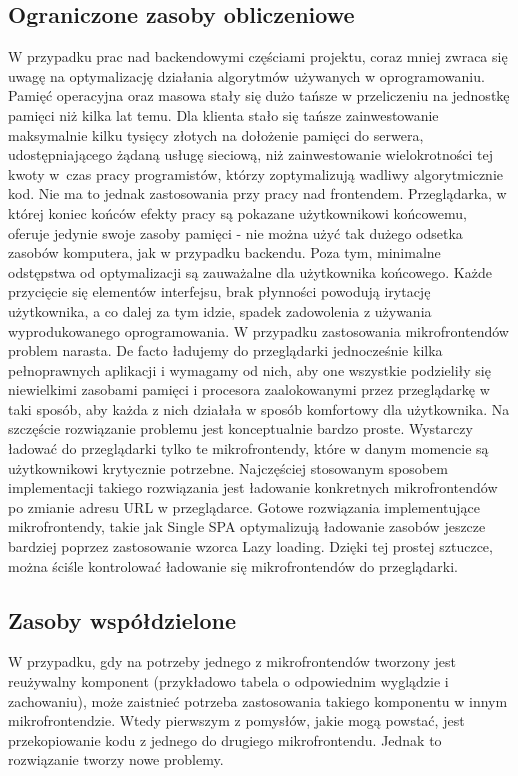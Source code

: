 \documentclass{SGGW-thesis}
\begin{document}
\subsection{Ograniczone zasoby obliczeniowe}
W przypadku prac nad backendowymi częściami projektu, coraz mniej zwraca się uwagę na optymalizację działania algorytmów używanych w oprogramowaniu. Pamięć operacyjna oraz masowa stały się dużo tańsze w przeliczeniu na jednostkę pamięci niż kilka lat temu. Dla klienta stało się tańsze zainwestowanie maksymalnie kilku tysięcy złotych na dołożenie pamięci do serwera, udostępniającego żądaną usługę sieciową, niż zainwestowanie wielokrotności tej kwoty w~czas pracy programistów, którzy zoptymalizują wadliwy algorytmicznie kod.
Nie ma to jednak zastosowania przy pracy nad frontendem. Przeglądarka, w której koniec końców efekty pracy są pokazane użytkownikowi końcowemu, oferuje jedynie swoje zasoby pamięci - nie można użyć tak dużego odsetka zasobów komputera, jak w przypadku backendu. Poza tym, minimalne odstępstwa od optymalizacji są zauważalne dla użytkownika końcowego. Każde przycięcie się elementów interfejsu, brak płynności powodują irytację użytkownika, a co dalej za tym idzie, spadek zadowolenia z używania wyprodukowanego oprogramowania. W przypadku zastosowania mikrofrontendów problem narasta. De facto ładujemy do przeglądarki jednocześnie kilka pełnoprawnych aplikacji i wymagamy od nich, aby one wszystkie podzieliły się niewielkimi zasobami pamięci i procesora zaalokowanymi przez przeglądarkę w taki sposób, aby każda z nich działała w sposób komfortowy dla użytkownika. Na szczęście rozwiązanie problemu jest konceptualnie bardzo proste. Wystarczy ładować do przeglądarki tylko te mikrofrontendy, które w danym momencie są użytkownikowi krytycznie potrzebne. Najczęściej stosowanym sposobem implementacji takiego rozwiązania jest ładowanie konkretnych mikrofrontendów po zmianie adresu URL w przeglądarce. Gotowe rozwiązania implementujące mikrofrontendy, takie jak Single SPA \cite{singlespa} optymalizują ładowanie zasobów jeszcze bardziej poprzez zastosowanie wzorca Lazy loading. Dzięki tej prostej sztuczce, można ściśle kontrolować ładowanie się mikrofrontendów do przeglądarki.

\subsection{Zasoby współdzielone}
W przypadku, gdy na potrzeby jednego z mikrofrontendów tworzony jest reużywalny komponent (przykładowo tabela o odpowiednim wyglądzie i zachowaniu), może zaistnieć potrzeba zastosowania takiego komponentu w innym mikrofrontendzie. Wtedy pierwszym z pomysłów, jakie mogą powstać, jest przekopiowanie kodu z jednego do drugiego mikrofrontendu. Jednak to rozwiązanie tworzy nowe problemy.
\end{document}
